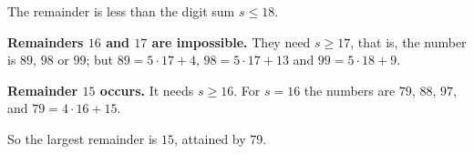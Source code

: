 The remainder is less than the digit sum $s\le18$.

\textbf{Remainders $16$ and $17$ are impossible.} They need $s\ge17$, that is, the number is $89$, $98$ or $99$; but $89=5\cdot17+4$, $98=5\cdot17+13$ and $99=5\cdot18+9$.

\textbf{Remainder $15$ occurs.} It needs $s\ge16$. For $s=16$ the numbers are $79$, $88$, $97$, and $79=4\cdot16+15$.

So the largest remainder is $\boxed{15}$, attained by $79$.
